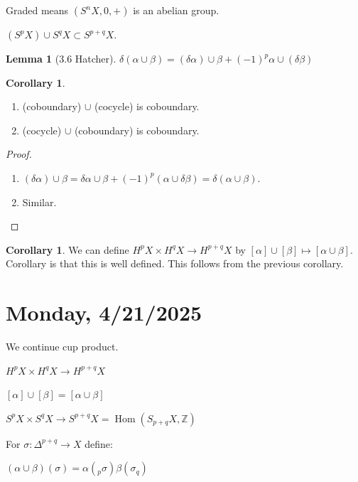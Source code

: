 \documentclass{article}
\theoremstyle{definition}
\newtheorem{lemma}[theorem]{Lemma}
\newtheorem{corollary}[theorem]{Corollary}
\begin{document}
    Graded means \((S^n X, 0, +)\) is an abelian group.

    \((S^p X) \cup S^q X \subset S^{p+q} X\).

    \begin{lemma}
        [3.6 Hatcher] \(\delta(\alpha \cup \beta) = (\delta \alpha) \cup \beta + (-1)^p \alpha \cup (\delta \beta)\) 
    \end{lemma}

    \begin{corollary}
        \begin{enumerate}[label=\arabic*)]
            \item (coboundary) \(\cup\) (cocycle) is coboundary.
            \item (cocycle) \(\cup\) (coboundary) is coboundary. 
        \end{enumerate} 
    \end{corollary}

    \begin{proof}
        \begin{enumerate}[label=\arabic*)]
            \item \((\delta \alpha) \cup \beta = \delta \alpha \cup \beta + (-1)^p (\alpha \cup \delta \beta) = \delta(\alpha \cup \beta)\).
            \item Similar.  
        \end{enumerate} 
    \end{proof}

    \begin{corollary}
        We can define \(H^p X \times H^q X \to H^{p+q} X\) by \([\alpha] \cup [\beta] \mapsto [\alpha \cup \beta]\). Corollary is that this is well defined. This follows from the previous corollary.
    \end{corollary}

    \section*{Monday, 4/21/2025}
    
    We continue cup product.

    \(H^p X \times H^q X \to H^{p+q} X\) 

    \([\alpha] \cup [\beta] = [\alpha \cup \beta]\) 

    \(S^p X \times S^q X \to S^{p+q} X = \operatorname{Hom}(S_{p+q} X, \mathbb{Z})\)

    For \(\sigma: \Delta^{p+q} \to X\) define:

    \((\alpha \cup \beta)(\sigma) = \alpha(_p \sigma) \beta(\sigma_q)\) 
\end{document}
